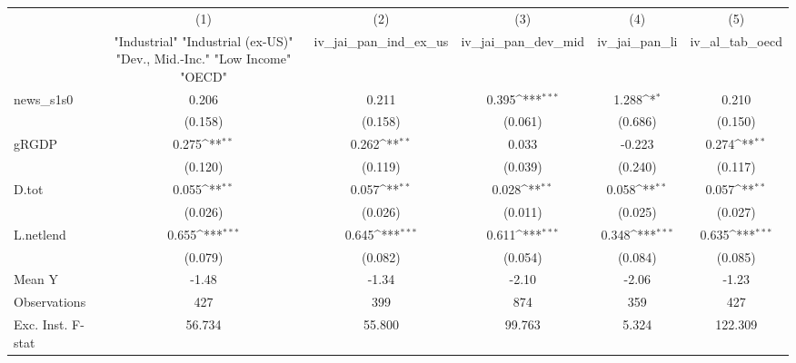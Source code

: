 {
\def\sym#1{\ifmmode^{#1}\else\(^{#1}\)\fi}
\begin{tabular}{l*{5}{c}}
\toprule
            &\multicolumn{1}{c}{(1)}&\multicolumn{1}{c}{(2)}&\multicolumn{1}{c}{(3)}&\multicolumn{1}{c}{(4)}&\multicolumn{1}{c}{(5)}\\
            &\multicolumn{1}{c}{ "Industrial" "Industrial (ex-US)" "Dev., Mid.-Inc." "Low Income" "OECD" }&\multicolumn{1}{c}{iv\_jai\_pan\_ind\_ex\_us}&\multicolumn{1}{c}{iv\_jai\_pan\_dev\_mid}&\multicolumn{1}{c}{iv\_jai\_pan\_li}&\multicolumn{1}{c}{iv\_al\_tab\_oecd}\\
\midrule
news\_s1s0   &       0.206         &       0.211         &       0.395\sym{***}&       1.288\sym{*}  &       0.210         \\
            &     (0.158)         &     (0.158)         &     (0.061)         &     (0.686)         &     (0.150)         \\
\addlinespace
gRGDP       &       0.275\sym{**} &       0.262\sym{**} &       0.033         &      -0.223         &       0.274\sym{**} \\
            &     (0.120)         &     (0.119)         &     (0.039)         &     (0.240)         &     (0.117)         \\
\addlinespace
D.tot       &       0.055\sym{**} &       0.057\sym{**} &       0.028\sym{**} &       0.058\sym{**} &       0.057\sym{**} \\
            &     (0.026)         &     (0.026)         &     (0.011)         &     (0.025)         &     (0.027)         \\
\addlinespace
L.netlend   &       0.655\sym{***}&       0.645\sym{***}&       0.611\sym{***}&       0.348\sym{***}&       0.635\sym{***}\\
            &     (0.079)         &     (0.082)         &     (0.054)         &     (0.084)         &     (0.085)         \\
\midrule
Mean Y      &       -1.48         &       -1.34         &       -2.10         &       -2.06         &       -1.23         \\
Observations&         427         &         399         &         874         &         359         &         427         \\
Exc. Inst. F-stat&      56.734         &      55.800         &      99.763         &       5.324         &     122.309         \\
\bottomrule
\end{tabular}
}
